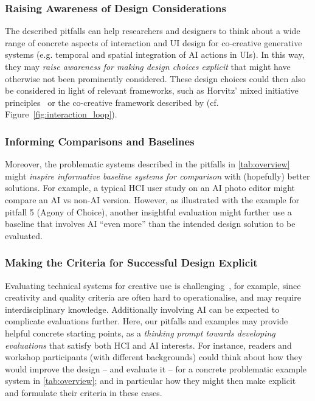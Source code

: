 \documentclass[
twocolumn,
]{ceurart}
\begin{document}
\subsubsection{Raising Awareness of Design Considerations}
The described pitfalls can help researchers and designers to think about a wide range of concrete aspects of interaction and UI design for co-creative generative systems (e.g. temporal and spatial integration of AI actions in UIs). In this way, they may \textit{raise awareness for making design choices explicit} that might have otherwise not been prominently considered. These design choices could then also be considered in light of relevant frameworks, such as Horvitz' mixed initiative principles~\cite{Horvitz1999} or the co-creative framework described by \citet{Guzdial2019} (cf. Figure~\ref{fig:interaction_loop}).


\subsubsection{Informing Comparisons and Baselines}
Moreover, the problematic systems described in the pitfalls in \cref{tab:overview} might \textit{inspire informative baseline systems for comparison} with (hopefully) better solutions. For example, a typical HCI user study on an AI photo editor might compare an AI vs non-AI version. However, as illustrated with the example for pitfall 5 (Agony of Choice), another insightful evaluation might further use a baseline that involves AI ``even more'' than the intended design solution to be evaluated.



\subsubsection{Making the Criteria for Successful Design Explicit}
Evaluating technical systems for creative use is challenging~\cite{Lamb2018}, for example, since creativity and quality criteria are often hard to operationalise, and may require interdisciplinary knowledge. Additionally involving AI can be expected to complicate evaluations further. Here, our pitfalls and examples may provide helpful concrete starting points, as a \textit{thinking prompt towards developing evaluations} that satisfy both HCI and AI interests. 
For instance, readers and workshop participants (with different backgrounds) could think about how they would improve the design -- and evaluate it -- for a concrete problematic example system in \cref{tab:overview}; and in particular how they might then make explicit and formulate their criteria in these cases.
\end{document}
